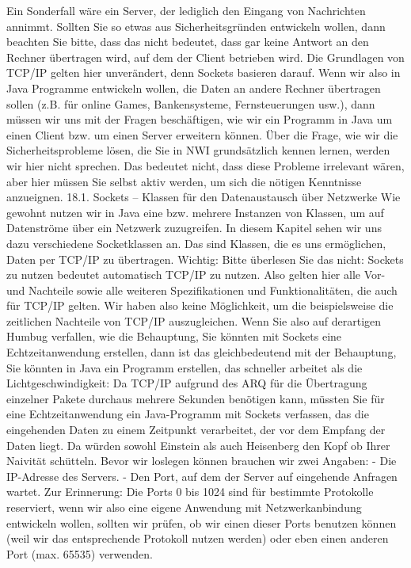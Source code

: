 Ein Sonderfall wäre ein Server, der lediglich den Eingang von Nachrichten annimmt. Sollten Sie so etwas aus Sicherheitsgründen entwickeln wollen, dann beachten Sie bitte, dass das nicht bedeutet, dass gar keine Antwort an den Rechner übertragen wird, auf dem der Client betrieben wird. Die Grundlagen von TCP/IP gelten hier unverändert, denn Sockets basieren darauf.
Wenn wir also in Java Programme entwickeln wollen, die Daten an andere Rechner übertragen sollen (z.B. für online Games, Bankensysteme, Fernsteuerungen usw.), dann müssen wir uns mit der Fragen beschäftigen, wie wir ein Programm in Java um einen Client bzw. um einen Server erweitern können. Über die Frage, wie wir die Sicherheitsprobleme lösen, die Sie in NWI grundsätzlich kennen lernen, werden wir hier nicht sprechen. Das bedeutet nicht, dass diese Probleme irrelevant wären, aber hier müssen Sie selbst aktiv werden, um sich die nötigen Kenntnisse anzueignen.
18.1.	Sockets – Klassen für den Datenaustausch über Netzwerke
Wie gewohnt nutzen wir in Java eine bzw. mehrere Instanzen von Klassen, um auf Datenströme über ein Netzwerk zuzugreifen. In diesem Kapitel sehen wir uns dazu verschiedene Socketklassen an. Das sind Klassen, die es uns ermöglichen, Daten per TCP/IP zu übertragen.
Wichtig:
Bitte überlesen Sie das nicht: Sockets zu nutzen bedeutet automatisch TCP/IP zu nutzen. Also gelten hier alle Vor- und Nachteile sowie alle weiteren Spezifikationen und Funktionalitäten, die auch für TCP/IP gelten. Wir haben also keine Möglichkeit, um die beispielsweise die zeitlichen Nachteile von TCP/IP auszugleichen. Wenn Sie also auf derartigen Humbug verfallen, wie die Behauptung, Sie könnten mit Sockets eine Echtzeitanwendung erstellen, dann ist das gleichbedeutend mit der Behauptung, Sie könnten in Java ein Programm erstellen, das schneller arbeitet als die Lichtgeschwindigkeit: Da TCP/IP aufgrund des ARQ für die Übertragung einzelner Pakete durchaus mehrere Sekunden benötigen kann, müssten Sie für eine Echtzeitanwendung ein Java-Programm mit Sockets verfassen, das die eingehenden Daten zu einem Zeitpunkt verarbeitet, der vor dem Empfang der Daten liegt. Da würden sowohl Einstein als auch Heisenberg den Kopf ob Ihrer Naivität schütteln.
Bevor wir loslegen können brauchen wir zwei Angaben:
-	Die IP-Adresse des Servers.
-	Den Port, auf dem der Server auf eingehende Anfragen wartet.
Zur Erinnerung:  Die Ports 0 bis 1024 sind für bestimmte Protokolle reserviert, wenn wir also eine eigene Anwendung mit Netzwerkanbindung entwickeln wollen, sollten wir prüfen, ob wir einen dieser Ports benutzen können (weil wir das entsprechende Protokoll nutzen werden) oder eben einen anderen Port (max. 65535) verwenden.
